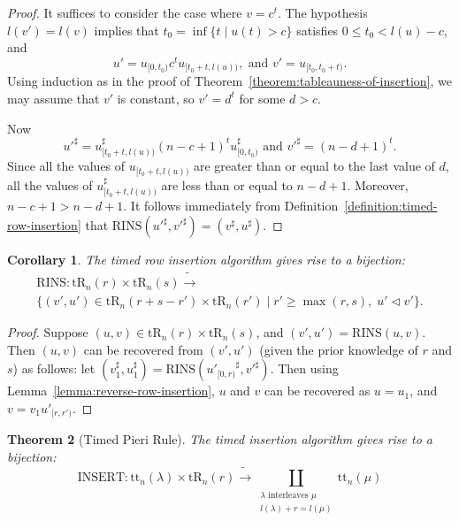 \documentclass[10pt]{amsproc}
\newtheorem{theorem}{Theorem}[subsection]
\newtheorem{corollary}[theorem]{Corollary}
\theoremstyle{definition}
\theoremstyle{remark}
\newcommand{\rowins}{\mathrm{RINS}}
\newcommand{\ins}{\mathrm{INSERT}}
\newcommand{\ttab}{\mathrm{tt}}
\newcommand{\tr}{\mathrm{tR}}
\begin{document}
\begin{proof}
  It suffices to consider the case where $v=c^t$.
  The hypothesis $l(v')=l(v)$ implies that $t_0=\inf\{t\mid u(t)>c\}$ satisfies $0\leq t_0<l(u)-c$, and
  \begin{displaymath}
    u'=u_{[0,t_0)}c^tu_{[t_0+t,l(u))}, \text{ and } v'=u_{[t_0,t_0+t)}.
  \end{displaymath}
  Using induction as in the proof of Theorem~\ref{theorem:tableauness-of-insertion}, we may assume that $v'$ is constant, so $v'=d^t$ for some $d>c$.

  Now
  \begin{displaymath}
    {u'}^\sharp=u_{[t_0+t,l(u))}^\sharp (n-c+1)^t u_{[0,t_0)}^\sharp \text{ and } {v'}^\sharp=(n-d+1)^t.
  \end{displaymath}
  Since all the values of $u_{[t_0+t,l(u))}$ are greater than or equal to the last value of $d$, all the values of $u_{[t_0+t,l(u))}^\sharp$ are less than or equal to $n-d+1$.
  Moreover, $n-c+1>n-d+1$.
  It follows immediately from Definition~\ref{definition:timed-row-insertion} that $\rowins({u'}^\sharp,{v'}^\sharp)=(v^\sharp,u^\sharp)$.
\end{proof}
\begin{corollary}
  \label{corollary:row-insertion-bijection}
  The timed row insertion algorithm gives rise to a bijection:
  \begin{multline*}
    \rowins: \tr_n(r)\times \tr_n(s) \tilde\to \\\{(v',u')\in \tr_n(r+s-r')\times \tr_n(r')\mid r'\geq \max(r,s),\; u'\lhd v'\}. 
  \end{multline*}
\end{corollary}
\begin{proof}
  Suppose $(u,v)\in \tr_n(r)\times \tr_n(s)$, and $(v',u')=\rowins(u,v)$.
  Then $(u,v)$ can be recovered from $(v',u')$ (given the prior knowledge of $r$ and $s$) as follows:
  let $(v_1^\sharp, u_1^\sharp)=\rowins({u'_{[0,r)}}^\sharp, {v'}^\sharp)$.
  Then using Lemma~\ref{lemma:reverse-row-insertion}, $u$ and $v$ can be recovered as $u=u_1$, and $v=v_1u'_{[r,r')}$.
\end{proof}
\begin{theorem}[Timed Pieri Rule]
  \label{theorem:pieri}
  The timed insertion algorithm gives rise to a bijection:
  \begin{displaymath}
    \ins: \ttab_n(\lambda)\times \tr_n(r) \tilde\to \coprod_{\begin{smallmatrix}\text{$\lambda$ interleaves $\mu$}\\{l(\lambda)+r = l(\mu)}\end{smallmatrix}} \ttab_n(\mu)
  \end{displaymath}
\end{theorem}
\end{document}
